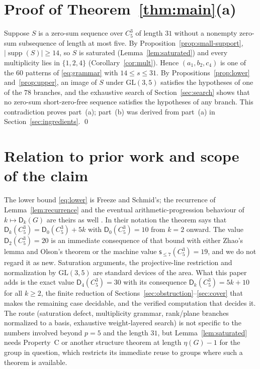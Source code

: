 \documentclass[11pt]{article}
\theoremstyle{definition}
\theoremstyle{remark}
\newcommand{\Dk}{\mathsf{D}}
\newcommand{\C}{C_5^{3}}
\newcommand{\supp}{\operatorname{supp}}
\newcommand{\sle}[1]{\mathsf{s}_{\le #1}}
\begin{document}
\section{Proof of Theorem~\ref{thm:main}(a)}\label{sec:proof}

Suppose $S$ is a zero-sum sequence over $\C$ of length $31$ without a nonempty zero-sum subsequence of length at most five. By Proposition~\ref{prop:small-support}, $|\supp(S)|\ge14$, so $S$ is saturated (Lemma~\ref{lem:saturated}) and every multiplicity lies in $\{1,2,4\}$ (Corollary~\ref{cor:mult}). Hence $(a_1,b_2,c_4)$ is one of the $60$ patterns of \eqref{eq:grammar} with $14\le s\le31$. By Propositions~\ref{prop:lower} and~\ref{prop:upper}, an image of $S$ under $\mathrm{GL}(3,5)$ satisfies the hypotheses of one of the $78$ branches, and the exhaustive search of Section~\ref{sec:search} shows that no zero-sum short-zero-free sequence satisfies the hypotheses of any branch. This contradiction proves part~(a); part~(b) was derived from part~(a) in Section~\ref{sec:ingredients}. \qed

\section{Relation to prior work and scope of the claim}\label{sec:prior}

The lower bound \eqref{eq:lower} is Freeze and Schmid's; the recurrence of Lemma~\ref{lem:recurrence} and the eventual arithmetic-progression behaviour of $k\mapsto\Dk_k(G)$ are theirs as well \cite{FreezeSchmid2010}. In their notation the theorem says that $\Dk_k(\C)=\Dk_0(\C)+5k$ with $\Dk_0(\C)=10$ from $k=2$ onward. The value $\Dk_2(\C)=20$ is an immediate consequence of that bound with either Zhao's lemma and Olson's theorem or the machine value $\sle{7}(\C)=19$, and we do not regard it as new. Saturation arguments, the projective-line restriction and normalization by $\mathrm{GL}(3,5)$ are standard devices of the area. What this paper adds is the exact value $\Dk_4(\C)=30$ with its consequence $\Dk_k(\C)=5k+10$ for all $k\ge2$, the finite reduction of Sections~\ref{sec:obstruction}--\ref{sec:cover} that makes the remaining case decidable, and the verified computation that decides it. The route (saturation defect, multiplicity grammar, rank/plane branches normalized to a basis, exhaustive weight-layered search) is not specific to the numbers involved beyond $p=5$ and the length $31$, but Lemma~\ref{lem:saturated} needs Property~C or another structure theorem at length $\eta(G)-1$ for the group in question, which restricts its immediate reuse to groups where such a theorem is available.
\end{document}
